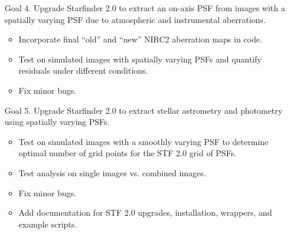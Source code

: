 \begin{enumerate}
\item[Goal 4.] Upgrade Starfinder 2.0 to extract an on-axis PSF from images with
  a spatially varying PSF due to atmospheric and instrumental aberrations.
  \begin{itemize}
  \item Incorporate final ``old'' and ``new'' NIRC2 aberration maps in code.
  \item Test on simulated images with spatially varying PSFs and
    quantify residuals under different conditions. 
  \item Fix minor bugs.
  \end{itemize}

\item[Goal 5.] Upgrade Starfinder 2.0 to extract stellar astrometry and
  photometry using spatially varying PSFs.
  \begin{itemize}
  \item Test on simulated images with a smoothly varying PSF to
    determine optimal number of grid points for the STF 2.0 grid of
    PSFs.
  \item Test analysis on single images vs. combined images.
  \item Fix minor bugs.
  \item Add documentation for STF 2.0 upgrades, installation,
    wrappers, and example scripts.
  \end{itemize}


\end{enumerate}
